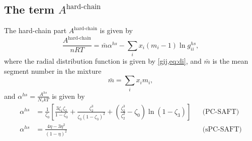 \documentclass[internal,english]{sintefmemo2012}
\newcommand{\z}{\zeta}
\newcommand{\lp}{\left(}
\newcommand{\rp}{\right)}
\begin{document}
\subsection{The term $A^{\text{hard-chain}}$}
The hard-chain part $A^{\text{hard-chain}}$ is given by
\begin{equation}
  \frac{A^{\text{hard-chain}}}{nRT} = \bar m \alpha^{hs} - \sum_i x_i(m_i-1)\ln g_{ii}^{hs},
\end{equation}
where the radial distribution function is given by \cref{gij,eq:di}, and $\bar m$ is the mean segment number in the mixture
\begin{equation}
  \bar m = \sum_i x_i m_i,
\end{equation}
and $\alpha^{hs} = \frac{A^{hs}}{N_s k T}$ is given by
\begin{align}
  \alpha^{hs} &= \frac{1}{\z_0} \left[ \frac{3\z_1\z_2}{1-\z_3} + \frac{\z_2^3}{\z_3(1-\z_3)^2} + \lp \frac{\z_2^3}{\z_2^2} - \z_0 \rp \ln(1-\z_3) \right]  && \text{(PC-SAFT)} \\
  \alpha^{hs} &= \frac{4\eta-3\eta^2}{(1-\eta)^2} && \text{(sPC-SAFT)} 
\end{align}
\end{document}
